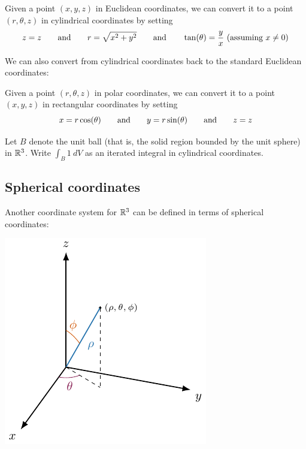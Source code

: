 \begin{definition}
Given a point $(x,y,z)$ in Euclidean coordinates, we can convert it to a point $(r,\theta,z)$ in cylindrical coordinates by setting 
    $$z = z \qquad \textnormal{and} \qquad r = \sqrt{x^2 + y^2} \qquad \textnormal{and} \qquad \tan(\theta) = \frac{y}{x} \ (\textnormal{assuming} \ x \neq 0)$$
\end{definition}

We can also convert from cylindrical coordinates back to the standard Euclidean coordinates:     
\begin{definition}
Given a point $(r,\theta,z)$ in polar coordinates, we can convert it to a point $(x,y,z)$ in rectangular coordinates by setting 
    $$x = r\cos(\theta) \qquad \textnormal{and} \qquad y = r\sin(\theta)\qquad \textnormal{and} \qquad z=z$$
\end{definition}

\begin{example}
    Let $B$ denote the unit ball (that is, the solid region bounded by the unit sphere) in $\mathbb{R}^3$.  Write $\int_B 1 \ dV$ as an iterated integral in cylindrical coordinates.
\end{example}

\subsection{Spherical coordinates}

Another coordinate system for $\mathbb{R}^3$ can be defined in terms of spherical coordinates:

    \begin{center}
        \includegraphics{chapters/4-IntegrationRn/figures/figures-spherical.pdf}
    \end{center}
    
